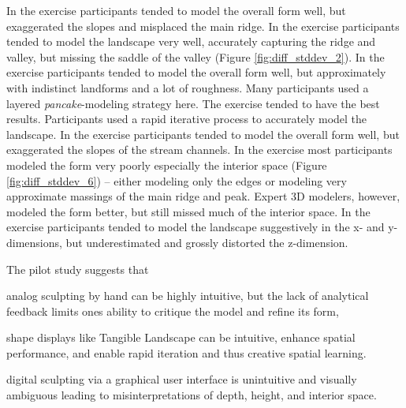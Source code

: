 \documentclass{sigchi}
\begin{document}
In the  exercise participants tended to model the overall form well, 
but exaggerated the slopes and misplaced the main ridge. 
%
In the  exercise participants tended to model the landscape very well, 
accurately capturing the ridge and valley, but missing the saddle of the valley 
(Figure \ref{fig:diff_stddev_2}).
%
In the  exercise participants tended to model the overall form well, but 
approximately with indistinct landforms and a lot of roughness. 
Many participants used a layered \emph{pancake}-modeling strategy here.
%
The  exercise tended to have the best results. 
Participants used a rapid iterative process 
to accurately model the landscape. 
%
In the  exercise participants tended to model the overall form well, but 
exaggerated the slopes of the stream channels. 
%
In the  exercise most participants modeled the form very poorly
especially the interior space
(Figure \ref{fig:diff_stddev_6})  
-- either modeling only the edges or 
modeling very approximate massings of 
the main ridge and peak. 
Expert 3D modelers, however, modeled the form better, 
but still missed much of the interior space.
%
In the  exercise participants tended to model 
the landscape suggestively in the x- and y-dimensions,
but underestimated and grossly distorted the z-dimension. 

The pilot study suggests that  
\begin{enumerate*}[label=\bfseries \arabic*.]
\item %
analog sculpting by hand can be highly intuitive, 
but the lack of analytical feedback limits 
ones ability to critique the model and refine its form,
\item %
shape displays like Tangible Landscape can be intuitive, 
enhance spatial performance,
and enable rapid iteration and thus creative spatial learning.
\item %
digital sculpting via a graphical user interface 
is unintuitive and visually ambiguous 
leading to misinterpretations of depth, height, and interior space.
\end{enumerate*} 
\end{document}
